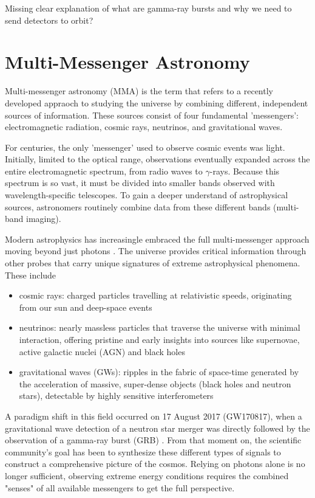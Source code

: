 \documentclass[
    aps,
    prd,
    twocolumn,
    nofootinbib,
    floatfix,
    superscriptaddress
]{revtex4-2}
\begin{document}
Missing clear explanation of what are gamma-ray bursts and why we need to send detectors to orbit?


\section{Multi-Messenger Astronomy}
Multi-messenger astronomy (MMA) is the term that refers to a recently developed appraoch to studying the universe by combining different, independent sources of information. These sources consist of four fundamental 'messengers': electromagnetic radiation, cosmic rays, neutrinos, and gravitational waves.

For centuries, the only 'messenger' used to observe cosmic events was light. Initially, limited to the optical range, observations eventually expanded across the entire electromagnetic spectrum, from radio waves to $\gamma$-rays. Because this spectrum is so vast, it must be divided into smaller bands observed with wavelength-specific telescopes. To gain a deeper understand of astrophysical sources, astronomers routinely combine data from these different bands (multi-band imaging).

Modern astrophysics has increasingle embraced the full multi-messenger approach moving beyond just photons \cite{2020_astro_decadal}. The universe provides critical information through other probes that carry unique signatures of extreme astrophysical phenomena. These include
\begin{itemize}
    \item cosmic rays: charged particles travelling at relativistic speeds, originating from our sun and deep-space events \cite{missing}
    \item neutrinos: nearly massless particles that traverse the universe with minimal interaction, offering pristine and early insights into sources like supernovae, active galactic nuclei (AGN) and black holes \cite{missing}
    \item gravitational waves (GWs): ripples in the fabric of space-time generated by the acceleration of massive, super-dense objects (black holes and neutron stars), detectable by highly sensitive interferometers \cite{missing}
\end{itemize}

A paradigm shift in this field occurred on 17 August 2017 (GW170817), when a gravitational wave detection of a neutron star merger was directly followed by the observation of a gamma-ray burst (GRB) \cite{Goldstein2017}. From that moment on, the scientific community's goal has been to synthesize these different types of signals to construct a comprehensive picture of the cosmos. Relying on photons alone is no longer sufficient, observing extreme energy conditions requires the combined "senses" of all available messengers to get the full perspective.
\end{document}
